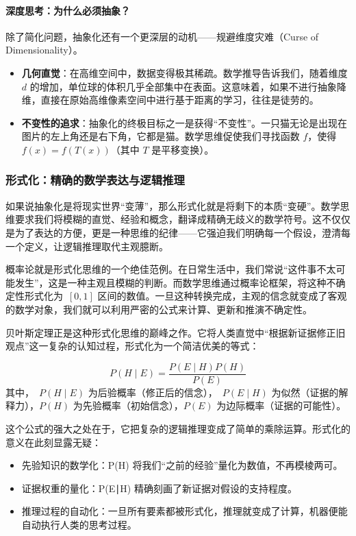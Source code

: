 \paragraph{深度思考：为什么必须抽象？}

除了简化问题，抽象化还有一个更深层的动机——规避维度灾难（Curse of Dimensionality）。 
\begin{itemize} 
  \item \textbf{几何直觉}：在高维空间中，数据变得极其稀疏。数学推导告诉我们，随着维度 $d$ 的增加，单位球的体积几乎全部集中在表面。这意味着，如果不进行抽象降维，直接在原始高维像素空间中进行基于距离的学习，往往是徒劳的。
  \item \textbf{不变性的追求}：抽象化的终极目标之一是获得“不变性”。一只猫无论是出现在图片的左上角还是右下角，它都是猫。数学思维促使我们寻找函数 $f$，使得~$f(x)=f(T(x))$（其中 $T$ 是平移变换）。 
\end{itemize}

\subsubsection{形式化：精确的数学表达与逻辑推理}

如果说抽象化是将现实世界“变薄”，那么形式化就是将剩下的本质“变硬”。数学思维要求我们将模糊的直觉、经验和概念，翻译成精确无歧义的数学符号。这不仅仅是为了表达的方便，更是一种思维的纪律——它强迫我们明确每一个假设，澄清每一个定义，让逻辑推理取代主观臆断。

概率论就是形式化思维的一个绝佳范例。在日常生活中，我们常说“这件事不太可能发生”，这是一种主观且模糊的判断。而数学思维通过概率论框架，将这种不确定性形式化为~$[0,1]$ 区间的数值。一旦这种转换完成，主观的信念就变成了客观的数学对象，我们就可以利用严密的公式来计算、更新和推演不确定性。

贝叶斯定理正是这种形式化思维的巅峰之作。它将人类直觉中“根据新证据修正旧观点”这一复杂的认知过程，形式化为一个简洁优美的等式：

\begin{theorem}[colback=green!5!white,colframe=green!75!black,title=核心定理：贝叶斯定理]
$$
P(H∣E)= \frac{P(E∣H)P(H)}{P(E)} 
$$
其中，~$P(H∣E)$ 为后验概率（修正后的信念），~$P(E∣H)$ 为似然（证据的解释力），$P(H)$ 为先验概率（初始信念），$P(E)$ 为边际概率（证据的可能性）。 
\end{theorem}

这个公式的强大之处在于，它把复杂的逻辑推理变成了简单的乘除运算。形式化的意义在此刻显露无疑： 
\begin{itemize} 
  \item 先验知识的数学化：P(H) 将我们“之前的经验”量化为数值，不再模棱两可。 \item 证据权重的量化：P(E∣H) 精确刻画了新证据对假设的支持程度。 
  \item 推理过程的自动化：一旦所有要素都被形式化，推理就变成了计算，机器便能自动执行人类的思考过程。 \end{itemize}

